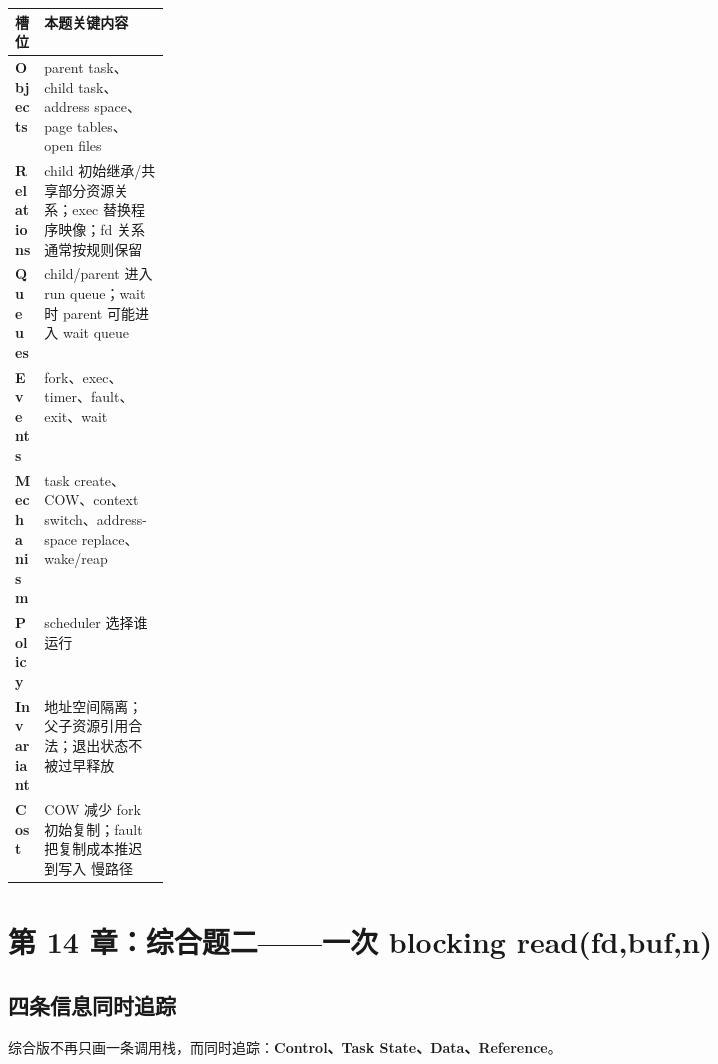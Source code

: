\documentclass[11pt,a4paper]{ctexart}
\newcommand{\kw}[1]{\textbf{#1}}
\begin{document}
\begin{center}
\small
\begin{tabularx}{\linewidth}{>{\bfseries}p{0.18\linewidth} X}
\toprule
槽位 & 本题关键内容 \\
\midrule
Objects & parent task、child task、address space、page tables、open files \\
Relations & child 初始继承/共享部分资源关系；exec 替换程序映像；fd 关系通常按规则保留 \\
Queues & child/parent 进入 run queue；wait 时 parent 可能进入 wait queue \\
Events & fork、exec、timer、fault、exit、wait \\
Mechanism & task create、COW、context switch、address-space replace、wake/reap \\
Policy & scheduler 选择谁运行 \\
Invariant & 地址空间隔离；父子资源引用合法；退出状态不被过早释放 \\
Cost & COW 减少 fork 初始复制；fault 把复制成本推迟到写入 慢路径 \\
\bottomrule
\end{tabularx}
\end{center}

\section{第 14 章：综合题二——一次 blocking read(fd,buf,n)}

\subsection{四条信息同时追踪}
综合版不再只画一条调用栈，而同时追踪：\kw{Control、Task State、Data、Reference}。
\end{document}

